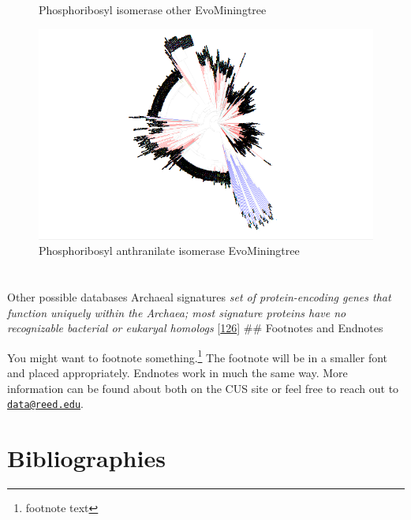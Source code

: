 \documentclass[12pt,twoside]{reedthesis}
\begin{document}
\begin{figure}[h!tbp]
  \caption[Phosphoribosyl isomerase other EvoMiningtree]{\normalsize{Phosphoribosyl isomerase other EvoMiningtree}}
  \label{fig:Phosphoribosyl_isomerase_other_evo_tree}
  \end{figure}\begin{figure}[h!tbp]
  \centering
  \includegraphics[angle = 180,scale = 0.25]{chapter2/Archaeas/tree65.png}
  \caption[Phosphoribosyl anthranilate isomerase EvoMiningtree]{\normalsize{Phosphoribosyl anthranilate isomerase EvoMiningtree}}
  \label{fig:Phosphoribosylanthranilate_isomerase_evo_tree}
  \end{figure}
  
  \clearpage 
  
  \hypertarget{section}{\section{}\label{section}}
  
  Other possible databases Archaeal signatures \emph{set of
  protein-encoding genes that function uniquely within the Archaea; most
  signature proteins have no recognizable bacterial or eukaryal homologs}
  {[}\protect\hyperlink{ref-graham_archaeal_2000}{126}{]} \#\# Footnotes
  and Endnotes
  
  You might want to footnote something.\footnote{footnote text} The
  footnote will be in a smaller font and placed appropriately. Endnotes
  work in much the same way. More information can be found about both on
  the CUS site or feel free to reach out to
  \href{mailto:data@reed.edu}{\nolinkurl{data@reed.edu}}.
  
  \section{Bibliographies}\label{bibliographies}
  
\end{document}
